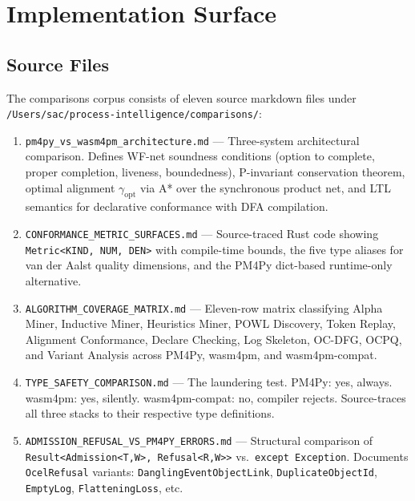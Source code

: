 
\section{Implementation Surface}
\label{sec:comparisons-impl}

\subsection{Source Files}
\label{sec:comparisons-impl-sources}

The comparisons corpus consists of eleven source markdown files under
\texttt{/Users/sac/process-intelligence/comparisons/}:

\begin{enumerate}
  \item \texttt{pm4py\_vs\_wasm4pm\_architecture.md} --- Three-system architectural
    comparison. Defines WF-net soundness conditions (option to complete, proper
    completion, liveness, boundedness), P-invariant conservation theorem, optimal
    alignment $\gamma_{\text{opt}}$ via A* over the synchronous product net, and
    LTL semantics for declarative conformance with DFA compilation.
  \item \texttt{CONFORMANCE\_METRIC\_SURFACES.md} --- Source-traced Rust code
    showing \texttt{Metric<KIND, NUM, DEN>} with compile-time bounds, the five
    type aliases for van der Aalst quality dimensions, and the PM4Py dict-based
    runtime-only alternative.
  \item \texttt{ALGORITHM\_COVERAGE\_MATRIX.md} --- Eleven-row matrix classifying
    Alpha Miner, Inductive Miner, Heuristics Miner, POWL Discovery, Token Replay,
    Alignment Conformance, Declare Checking, Log Skeleton, OC-DFG, OCPQ, and
    Variant Analysis across PM4Py, wasm4pm, and wasm4pm-compat.
  \item \texttt{TYPE\_SAFETY\_COMPARISON.md} --- The laundering test. PM4Py:
    yes, always. wasm4pm: yes, silently. wasm4pm-compat: no, compiler rejects.
    Source-traces all three stacks to their respective type definitions.
  \item \texttt{ADMISSION\_REFUSAL\_VS\_PM4PY\_ERRORS.md} --- Structural comparison
    of \texttt{Result<Admission<T,W>, Refusal<R,W>>} vs.\ \texttt{except Exception}.
    Documents \texttt{OcelRefusal} variants: \texttt{DanglingEventObjectLink},
    \texttt{DuplicateObjectId}, \texttt{EmptyLog}, \texttt{FlatteningLoss}, etc.

\end{enumerate}
